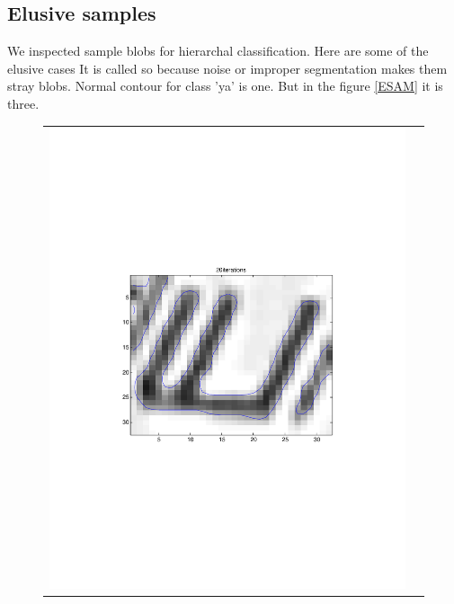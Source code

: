 \subsection{Elusive samples}
We inspected sample blobs for hierarchal classification. Here are some of the elusive cases
It is called so because noise or improper segmentation makes them stray blobs. Normal contour 
for class 'ya' is one. But in the figure \ref{ESAM} it is three. 
\begin{center}
\begin{figure}\centering

\begin{tabular}{ cc }
\includegraphics[scale=0.4]{./img/ya} &

\end{tabular}
\end{figure}
\end{center}
